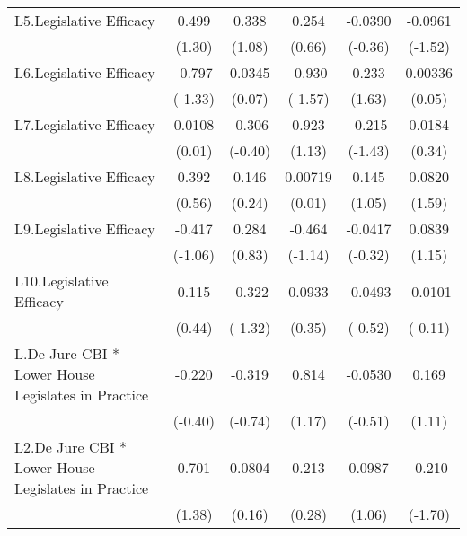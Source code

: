 {\begin{longtable}{l*{5}{c}}
L5.Legislative Efficacy&    0.499         &    0.338         &    0.254         &  -0.0390         &  -0.0961         \\
                &   (1.30)         &   (1.08)         &   (0.66)         &  (-0.36)         &  (-1.52)         \\
\addlinespace
L6.Legislative Efficacy&   -0.797         &   0.0345         &   -0.930         &    0.233         &  0.00336         \\
                &  (-1.33)         &   (0.07)         &  (-1.57)         &   (1.63)         &   (0.05)         \\
\addlinespace
L7.Legislative Efficacy&   0.0108         &   -0.306         &    0.923         &   -0.215         &   0.0184         \\
                &   (0.01)         &  (-0.40)         &   (1.13)         &  (-1.43)         &   (0.34)         \\
\addlinespace
L8.Legislative Efficacy&    0.392         &    0.146         &  0.00719         &    0.145         &   0.0820         \\
                &   (0.56)         &   (0.24)         &   (0.01)         &   (1.05)         &   (1.59)         \\
\addlinespace
L9.Legislative Efficacy&   -0.417         &    0.284         &   -0.464         &  -0.0417         &   0.0839         \\
                &  (-1.06)         &   (0.83)         &  (-1.14)         &  (-0.32)         &   (1.15)         \\
\addlinespace
L10.Legislative Efficacy&    0.115         &   -0.322         &   0.0933         &  -0.0493         &  -0.0101         \\
                &   (0.44)         &  (-1.32)         &   (0.35)         &  (-0.52)         &  (-0.11)         \\
\addlinespace
L.De Jure CBI * Lower House Legislates in Practice&   -0.220         &   -0.319         &    0.814         &  -0.0530         &    0.169         \\
                &  (-0.40)         &  (-0.74)         &   (1.17)         &  (-0.51)         &   (1.11)         \\
\addlinespace
L2.De Jure CBI * Lower House Legislates in Practice&    0.701         &   0.0804         &    0.213         &   0.0987         &   -0.210         \\
                &   (1.38)         &   (0.16)         &   (0.28)         &   (1.06)         &  (-1.70)         \\

\end{longtable}}
